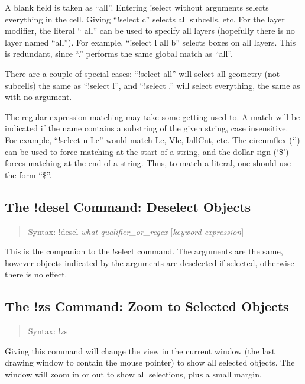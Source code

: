 A blank field is taken as ``all''.  Entering {\vt !select} without
arguments selects everything in the cell.  Giving ``{\vt !select c}''
selects all subcells, etc.  For the layer modifier, the literal ``{\vt
all}'' can be used to specify all layers (hopefully there is no layer
named ``all'').  For example, ``{\vt !select l all b}'' selects boxes on
all layers.  This is redundant, since ``.'' performs the same global
match as ``all''.

There are a couple of special cases:  ``{\vt !select all}'' will
select all geometry (not subcells) the same as ``{\vt !select l}'',
and ``{\vt !select .}'' will select everything, the same as with no
argument.

The regular expression matching may take some getting used-to.  A
match will be indicated if the name contains a substring of the given
string, case insensitive.  For example, ``{\vt !select n Lc}'' would
match {\vt Lc, Vlc, IallCnt}, etc.  The circumflex (`') can
be used to force matching at the start of a string, and the dollar
sign (`\$') forces matching at the end of a string.  Thus, to match a
literal, one should use the form ``\$''.

\subsection{The {\cb !desel} Command: Deselect Objects}
\begin{quote}
Syntax: {\vt !desel} {\it what qualifier\_or\_regex}
 [{\it keyword expression}\/]
\end{quote}
This is the companion to the {\cb !select} command.  The arguments are
the same, however objects indicated by the arguments are deselected if
selected, otherwise there is no effect.

\subsection{The {\cb !zs} Command: Zoom to Selected Objects}
\begin{quote}
Syntax: {\vt !zs}
\end{quote}
Giving this command will change the view in the current window (the
last drawing window to contain the mouse pointer) to show all selected
objects.  The window will zoom in or out to show all selections, plus
a small margin.


